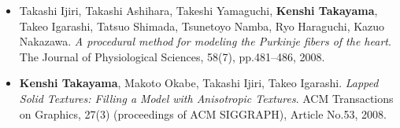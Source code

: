 \begin{itemize}
\item Takashi Ijiri, Takashi Ashihara, Takeshi Yamaguchi, {\bf Kenshi Takayama}, Takeo Igarashi, Tatsuo Shimada, Tsunetoyo Namba, Ryo Haraguchi, Kazuo Nakazawa. {\it A procedural method for modeling the Purkinje fibers of the heart}. The Journal of Physiological Sciences, 58(7), pp.481--486, 2008.
\item {\bf Kenshi Takayama}, Makoto Okabe, Takashi Ijiri, Takeo Igarashi. {\it Lapped Solid Textures: Filling a Model with Anisotropic Textures}. ACM Transactions on Graphics, 27(3) (proceedings of ACM SIGGRAPH), Article No.53, 2008.
\end{itemize}
